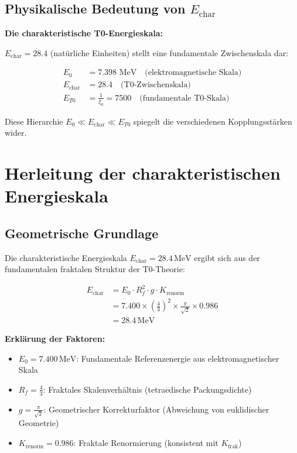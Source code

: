 \documentclass[12pt,a4paper]{article}
\begin{document}
	\subsection{Physikalische Bedeutung von $E_{\text{char}}$}
	
	\begin{keyresult}
		\textbf{Die charakteristische T0-Energieskala:}
		
		$E_{\text{char}} = 28.4$ (natürliche Einheiten) stellt eine fundamentale Zwischenskala dar:
		
		\begin{align}
			E_0 &= 7.398 \text{ MeV} \quad \text{(elektromagnetische Skala)} \\
			E_{\text{char}} &= 28.4 \quad \text{(T0-Zwischenskala)} \\
			E_{T0} &= \frac{1}{\xi_0} = 7500 \quad \text{(fundamentale T0-Skala)}
		\end{align}
		
		Diese Hierarchie $E_0 \ll E_{\text{char}} \ll E_{T0}$ spiegelt die verschiedenen Kopplungsstärken wider.
	\end{keyresult}
	
	\section{Herleitung der charakteristischen Energieskala}
	
	\subsection{Geometrische Grundlage}
	
	Die charakteristische Energieskala $E_{\text{char}} = 28.4\,\text{MeV}$ ergibt sich aus der fundamentalen fraktalen Struktur der T0-Theorie:
	
	\begin{align}
		E_{\text{char}} &= E_0 \cdot R_f^2 \cdot g \cdot K_{\text{renorm}} \\
		&= 7.400 \times \left(\frac{4}{3}\right)^2 \times \frac{\pi}{\sqrt{2}} \times 0.986 \\
		&= 28.4\,\text{MeV}
	\end{align}
	
	\textbf{Erklärung der Faktoren:}
	\begin{itemize}
		\item $E_0 = 7.400\,\text{MeV}$: Fundamentale Referenzenergie aus elektromagnetischer Skala
		\item $R_f = \frac{4}{3}$: Fraktales Skalenverhältnis (tetraedische Packungsdichte)  
		\item $g = \frac{\pi}{\sqrt{2}}$: Geometrischer Korrekturfaktor (Abweichung von euklidischer Geometrie)
		\item $K_{\text{renorm}} = 0.986$: Fraktale Renormierung (konsistent mit $K_{\text{frak}}$)
	\end{itemize}
	
\end{document}

